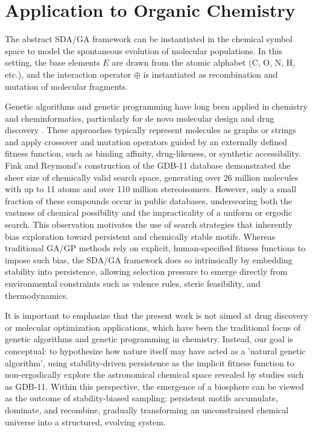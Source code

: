 \documentclass[life,article,submit,pdftex,moreauthors]{Definitions/mdpi}
\begin{document}
\section{Application to Organic Chemistry}

The abstract SDA/GA framework can be instantiated in the chemical symbol space to model
the spontaneous evolution of molecular populations. In this setting, the base elements
$E$ are drawn from the atomic alphabet (C, O, N, H, etc.), and the interaction operator
$\oplus$ is instantiated as recombination and mutation of molecular fragments. 

Genetic algorithms and genetic programming have long been applied in chemistry and 
cheminformatics, particularly for de novo molecular design and drug discovery 
\cite{brown2004ga,lewis1998gp,jensen2019ga,yoshikawa2018ga}. These approaches typically 
represent molecules as graphs or strings and apply crossover and mutation operators 
guided by an externally defined fitness function, such as binding affinity, 
drug-likeness, or synthetic accessibility. Fink and Reymond’s construction of the
GDB-11 database \cite{fink2007gdb11} demonstrated the sheer size of chemically valid
search space, generating over 26 million molecules with up to 11 atoms and over
110 million stereoisomers. However, only a small fraction of these compounds occur in
public databases, underscoring both the vastness of chemical possibility and the impracticality of a uniform or ergodic search. This observation motivates the use of
search strategies that inherently bias exploration toward persistent and chemically
stable motifs. Whereas traditional GA/GP methods rely on explicit, human-specified 
fitness functions to impose such bias, the SDA/GA framework does so intrinsically by
embedding stability into persistence, allowing selection pressure to emerge directly
from environmental constraints such as valence rules, steric feasibility, and
thermodynamics.

It is important to emphasize that the present work is not aimed at drug discovery
or molecular optimization applications, which have been the traditional focus of
genetic algorithms and genetic programming in chemistry. Instead, our goal is
conceptual: to hypothesize how nature itself may have acted as a 'natural genetic algorithm', using stability-driven persistence as the implicit fitness function to
non-ergodically explore the astronomical chemical space revealed by studies such
as GDB-11. Within this perspective, the emergence of a biosphere can be viewed as
the outcome of stability-biased sampling: persistent motifs accumulate, dominate, 
and recombine, gradually transforming an unconstrained chemical universe into a
structured, evolving system.
\end{document}
